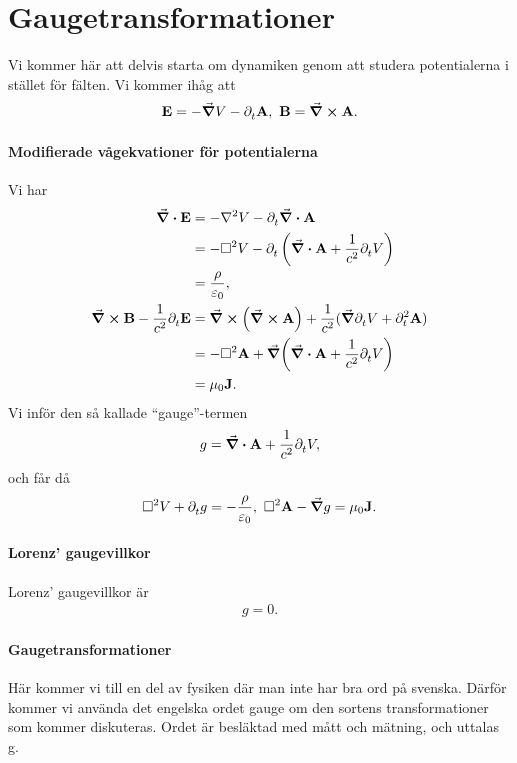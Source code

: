 \section{Gaugetransformationer}

Vi kommer här att delvis starta om dynamiken genom att studera potentialerna i stället för fälten. Vi kommer ihåg att
\begin{align*}
	\vb{E} = -\grad{V} - \partial_{t}^{}\vb{A},\ \vb{B} = \curl{\vb{A}}.
\end{align*}

\paragraph{Modifierade vågekvationer för potentialerna}
Vi har
\begin{align*}
	\div{\vb{E}}                                   &= -\laplacian{V} - \del{t}{\div{\vb{A}}} \\
	                                               &= -\dalemb{V} - \del{t}{\left(\div{\vb{A}} + \frac{1}{c^{2}}\del{t}{V}\right)} \\
	                                               &= \frac{\rho}{\varepsilon_{0}}, \\
	\curl{\vb{B}} - \frac{1}{c^{2}}\del{t}{\vb{E}} &= \curl(\curl{\vb{A}}) + \frac{1}{c^{2}}(\grad{\del{t}{V}} + \del[2]{t}{\vb{A}}) \\
	                                               &= -\dalemb{\vb{A}} + \grad(\div{\vb{A}} + \frac{1}{c^{2}}\del{t}{V}) \\
	                                               &= \mu_{0}\vb{J}.
\end{align*}
Vi inför den så kallade ``gauge''-termen
\begin{align*}
	g = \div{\vb{A}} + \frac{1}{c^{2}}\partial_{t}^{}V,
\end{align*}
och får då
\begin{align*}
	\dalemb{V} + \del{t}{g} = -\frac{\rho}{\varepsilon_{0}},\ \dalemb{\vb{A}} - \grad{g} = \mu_{0}\vb{J}.
\end{align*}

\paragraph{Lorenz' gaugevillkor}
Lorenz' gaugevillkor är
\begin{align*}
	g = 0.
\end{align*}

\paragraph{Gaugetransformationer}
Här kommer vi till en del av fysiken där man inte har bra ord på svenska. Därför kommer vi använda det engelska ordet gauge om den sortens transformationer som kommer diskuteras. Ordet är besläktad med mått och mätning, och uttalas g.

